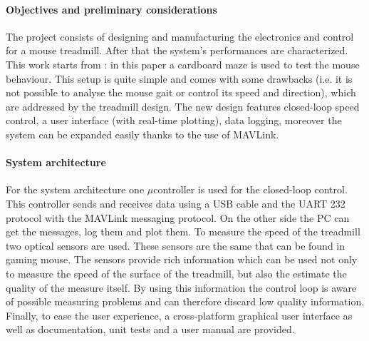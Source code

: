 \documentclass[12pt,a4paper, twoside]{article}
\begin{document}
\begin{multicols}{2}
[]

\paragraph{Objectives and preliminary considerations} 
\indent
\lfoot{\today}
The project consists of designing and manufacturing the electronics and control for a mouse treadmill. After that the system's performances are characterized. This work starts from \cite{Ole}: in this paper a cardboard maze is used to test the mouse behaviour. This setup is quite simple and comes with some drawbacks (i.e. it is not possible to analyse the mouse gait or control its speed and direction), which are addressed by the treadmill design. The new design features closed-loop speed control, a user interface (with real-time plotting), data logging, moreover the system can be expanded easily thanks to the use of MAVLink.
\paragraph{System architecture}
 For the system architecture one $\mu$controller is used for the closed-loop control. This controller sends and receives data using a USB cable and the UART 232 protocol with the MAVLink messaging protocol. On the other side the PC can get the messages, log them and plot them. To measure the speed of the treadmill two optical sensors are used. These sensors are the same that can be found in gaming mouse. The sensors provide rich information which can be used not only to measure the speed of the surface of the treadmill, but also the estimate the quality of the measure itself. By using this information the control loop is aware of possible measuring problems and can therefore discard low quality information.\\
 Finally, to ease the user experience, a cross-platform graphical user interface as well as documentation, unit tests and a user manual are provided. 


\end{multicols}
\end{document}
